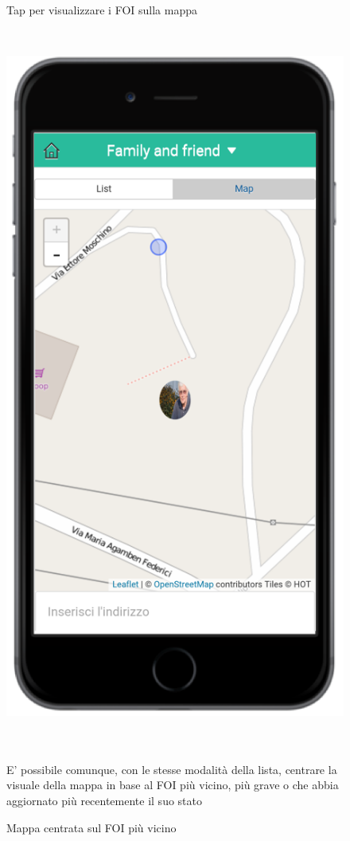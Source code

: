 \begin{figure}
\begin{minipage}[b]{6cm}
	\caption{Tap per visualizzare i FOI sulla mappa }
	\label{fig:mapfoi}
 \end{minipage}
 \ \hspace{6 mm} \hspace{7 mm} \
 \begin{minipage}[b]{6cm}
\centering
	\includegraphics[scale=0.9]{interfaccia/mappafoi.png}
	\caption{Mappa centrata sul FOI più vicino }
	\label{fig:mappafoi}
 \end{minipage}
 \\ \\
E' possibile comunque, con le stesse modalità della lista, centrare la visuale della mappa in base al FOI più vicino, più grave o che abbia aggiornato più recentemente il suo stato
\end{figure}



